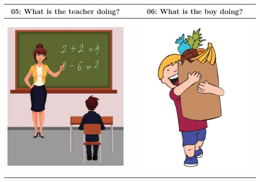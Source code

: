 \documentclass[12pt,notitlepage]{article}
\begin{document}
\begin{center}
\begin{tabular}{|c|c|c|}
\hline
05: What is the teacher doing? && 06: What is the boy doing? \\
\hline
\includegraphics[width=20em,trim=0 0 0 -3]{figures/I05.jpg} & & \includegraphics[width=20em,trim=0 0 0 -3]{figures/I06.jpg} \\
\hline
\end{tabular}
\vspace{1em} \\



\end{center}
\end{document}
